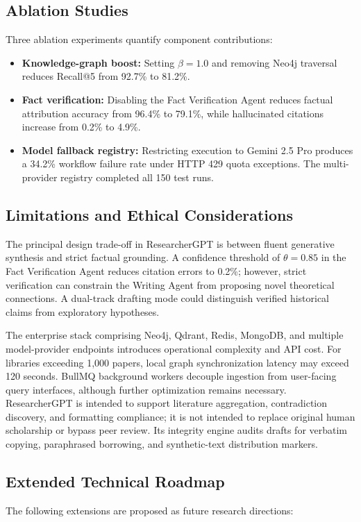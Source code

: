 \documentclass[conference]{IEEEtran}
\begin{document}
\subsection{Ablation Studies}
Three ablation experiments quantify component contributions:
\begin{itemize}
\item \textbf{Knowledge-graph boost:} Setting $\beta = 1.0$ and removing Neo4j traversal reduces Recall@5 from 92.7\% to 81.2\%.
\item \textbf{Fact verification:} Disabling the Fact Verification Agent reduces factual attribution accuracy from 96.4\% to 79.1\%, while hallucinated citations increase from 0.2\% to 4.9\%.
\item \textbf{Model fallback registry:} Restricting execution to Gemini 2.5 Pro produces a 34.2\% workflow failure rate under HTTP 429 quota exceptions. The multi-provider registry completed all 150 test runs.
\end{itemize}

\subsection{Limitations and Ethical Considerations}
The principal design trade-off in ResearcherGPT is between fluent generative synthesis and strict factual grounding. A confidence threshold of $\theta = 0.85$ in the Fact Verification Agent reduces citation errors to 0.2\%; however, strict verification can constrain the Writing Agent from proposing novel theoretical connections. A dual-track drafting mode could distinguish verified historical claims from exploratory hypotheses.

The enterprise stack comprising Neo4j, Qdrant, Redis, MongoDB, and multiple model-provider endpoints introduces operational complexity and API cost. For libraries exceeding 1,000 papers, local graph synchronization latency may exceed 120 seconds. BullMQ background workers decouple ingestion from user-facing query interfaces, although further optimization remains necessary. ResearcherGPT is intended to support literature aggregation, contradiction discovery, and formatting compliance; it is not intended to replace original human scholarship or bypass peer review. Its integrity engine audits drafts for verbatim copying, paraphrased borrowing, and synthetic-text distribution markers.

\subsection{Extended Technical Roadmap}
The following extensions are proposed as future research directions:
\end{document}
